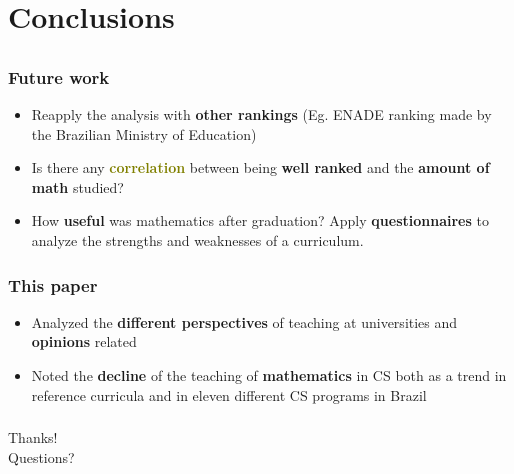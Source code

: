 \documentclass{beamer}
\begin{document}
\section{Conclusions}
\subsection{}

\begin{frame}
\frametitle{Future work}
\begin{itemize}
	\item Reapply the analysis with \textbf{\textcolor{n_red}{other rankings}}
	(Eg. ENADE ranking made by the Brazilian Ministry of Education)
	\item Is there any \textbf{\textcolor{olive}{correlation}} between being
	\textbf{\textcolor{n_violet}{well ranked}} and the
	\textbf{\textcolor{RawSienna}{amount of math}} studied?
	\item How \textbf{\textcolor{n_green}{useful}} was mathematics after
	graduation? Apply \textbf{\textcolor{n_blue}{questionnaires}} to
	analyze the strengths and weaknesses of
	a curriculum.
\end{itemize}
\end{frame}

\begin{frame}
\frametitle{This paper}
\begin{itemize}
	\item Analyzed the \textbf{\textcolor{n_red}{different perspectives}} of
	teaching at universities and \textbf{\textcolor{n_green}{opinions}} related
	\item Noted the \textbf{\textcolor{n_violet}{decline}} of the teaching of
	\textbf{\textcolor{RawSienna}{mathematics}} in CS both as a trend in reference
	curricula and in eleven
	different CS programs in Brazil
\end{itemize}
\end{frame}

\begin{frame}
\frametitle{}

\begin{center}
\Huge Thanks! \\
\Large Questions?
\end{center}

\end{frame}
\end{document}
